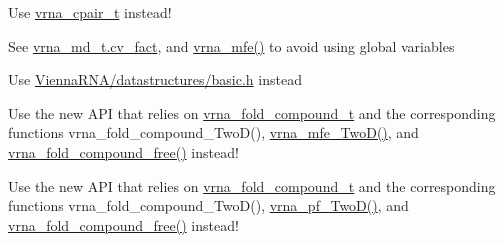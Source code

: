 \begin{DoxyRefList}
\item[\label{deprecated__deprecated000199}%
\Hypertarget{deprecated__deprecated000199}%
Global \hyperlink{group__data__structures_ga8412f116a2eb07b59ade9e14ca7c5ef1}{cpair} ]Use \hyperlink{group__data__structures_gae4fc91141cc69c6d8eaf1332cb991ecc}{vrna\+\_\+cpair\+\_\+t} instead!  
\item[\label{deprecated__deprecated000016}%
\Hypertarget{deprecated__deprecated000016}%
Global \hyperlink{alifold_8h_af3cbac6ff5d706d6e414677841ddf94c}{cv\+\_\+fact} ]See \hyperlink{group__model__details_a62ebefb9d0643e5c4c8a2ec84a105ce6}{vrna\+\_\+md\+\_\+t.\+cv\+\_\+fact}, and \hyperlink{group__mfe__global_gabd3b147371ccf25c577f88bbbaf159fd}{vrna\+\_\+mfe()} to avoid using global variables 
\item[\label{deprecated__deprecated000046}%
\Hypertarget{deprecated__deprecated000046}%
File \hyperlink{data__structures_8h}{data\+\_\+structures.h} ]Use \hyperlink{datastructures_2basic_8h}{Vienna\+R\+N\+A/datastructures/basic.\+h} instead  
\item[\label{deprecated__deprecated000003}%
\Hypertarget{deprecated__deprecated000003}%
Global \hyperlink{group__kl__neighborhood__mfe_ga05bf4f31d216b1b160fd2d3d68e9b487}{destroy\+\_\+\+Two\+Dfold\+\_\+variables} (\hyperlink{group__kl__neighborhood__mfe_structTwoDfold__vars}{Two\+Dfold\+\_\+vars} $\ast$our\+\_\+variables)]Use the new A\+PI that relies on \hyperlink{group__fold__compound_ga1b0cef17fd40466cef5968eaeeff6166}{vrna\+\_\+fold\+\_\+compound\+\_\+t} and the corresponding functions vrna\+\_\+fold\+\_\+compound\+\_\+\+Two\+D(), \hyperlink{group__kl__neighborhood__mfe_ga243c288b463147352829df04de6a2f77}{vrna\+\_\+mfe\+\_\+\+Two\+D()}, and \hyperlink{group__fold__compound_ga576a077b418a9c3650e06f8e5d296fc2}{vrna\+\_\+fold\+\_\+compound\+\_\+free()} instead! 
\item[\label{deprecated__deprecated000008}%
\Hypertarget{deprecated__deprecated000008}%
Global \hyperlink{2Dpfold_8h_afe994291458ee2ac34d3eb825ef62a15}{destroy\+\_\+\+Two\+Dpfold\+\_\+variables} (\hyperlink{structTwoDpfold__vars}{Two\+Dpfold\+\_\+vars} $\ast$vars)]Use the new A\+PI that relies on \hyperlink{group__fold__compound_ga1b0cef17fd40466cef5968eaeeff6166}{vrna\+\_\+fold\+\_\+compound\+\_\+t} and the corresponding functions vrna\+\_\+fold\+\_\+compound\+\_\+\+Two\+D(), \hyperlink{group__kl__neighborhood__pf_ga0bc3427689bd09da09b8b3094a27f836}{vrna\+\_\+pf\+\_\+\+Two\+D()}, and \hyperlink{group__fold__compound_ga576a077b418a9c3650e06f8e5d296fc2}{vrna\+\_\+fold\+\_\+compound\+\_\+free()} instead! 

\end{DoxyRefList}
